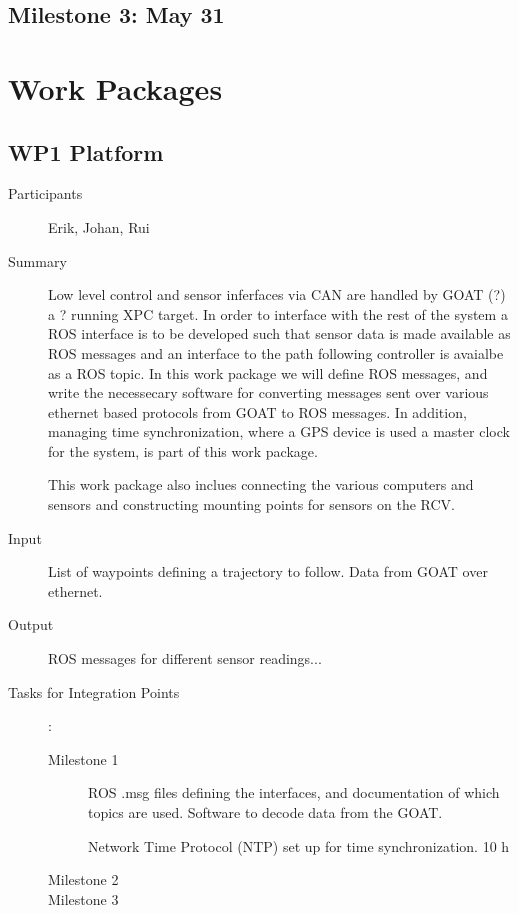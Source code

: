 \documentclass[11pt,a4paper]{article}
\begin{document}
\subsection{Milestone 3: May 31}
\label{milestone3}

\section{Work Packages}

\subsection{WP1 Platform} %

\begin{description}
\item[Participants] Erik, Johan, Rui
\item[Summary] Low level control and sensor inferfaces via CAN are
  handled by GOAT (?)  a ? running XPC target. In order to interface
  with the rest of the system a ROS interface is to be developed such
  that sensor data is made available as ROS messages and an interface
  to the path following controller is avaialbe as a ROS topic. In this
  work package we will define ROS messages, and write the necessecary
  software for converting messages sent over various ethernet based
  protocols from GOAT to ROS messages. In addition, managing time
  synchronization, where a GPS device is used a master clock for the
  system, is part of this work package.

  This work package also inclues connecting the various computers and
  sensors and constructing mounting points for sensors on the RCV.
   
\item[Input] List of waypoints defining a trajectory to follow. Data from 
  GOAT over ethernet.
\item[Output] ROS messages for different sensor readings...
\item[Tasks for Integration Points]:\
	\begin{description}
		\item[Milestone 1] ROS .msg files defining the interfaces, and documentation of which topics
  are used. Software to decode data from the GOAT. 

  Network Time Protocol (NTP) set up for time synchronization. 10 h
		\item[Milestone 2]
		\item[Milestone 3] 
	\end{description}	 
\end{description}
\end{document}
